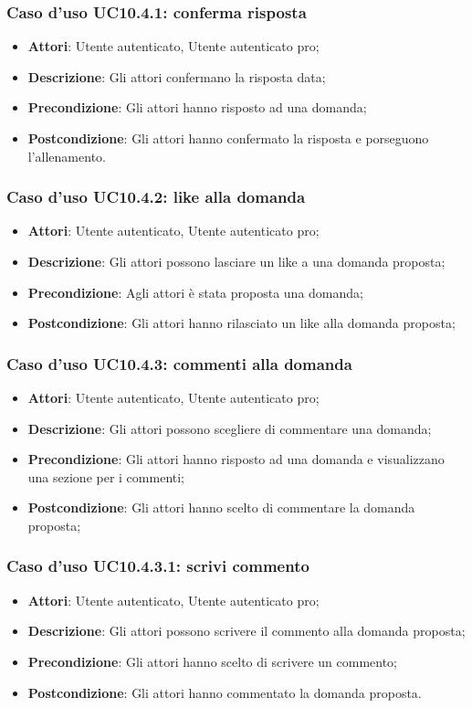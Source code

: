 \subsubsection{Caso d'uso UC10.4.1: conferma risposta}
	\begin{itemize}
		\item \textbf{Attori}: Utente autenticato, Utente autenticato pro;
		\item \textbf{Descrizione}: Gli attori confermano la risposta data;
		\item \textbf{Precondizione}: Gli attori hanno risposto ad una domanda;
		\item \textbf{Postcondizione}: Gli attori hanno confermato la risposta e porseguono l'allenamento.
	\end{itemize}
\subsubsection{Caso d'uso UC10.4.2: like alla domanda}
	\begin{itemize}
		\item \textbf{Attori}: Utente autenticato, Utente autenticato pro;
		\item \textbf{Descrizione}: Gli attori possono lasciare un like a una domanda proposta;
		\item \textbf{Precondizione}: Agli attori è stata proposta una domanda;
		\item \textbf{Postcondizione}: Gli attori hanno rilasciato un like alla domanda proposta;
	\end{itemize}
\subsubsection{Caso d'uso UC10.4.3: commenti alla domanda}
	\begin{itemize}
		\item \textbf{Attori}: Utente autenticato, Utente autenticato pro;
		\item \textbf{Descrizione}: Gli attori possono scegliere di commentare una domanda;
		\item \textbf{Precondizione}: Gli attori hanno risposto ad una domanda e visualizzano una sezione per i commenti;
		\item \textbf{Postcondizione}: Gli attori hanno scelto di commentare la domanda proposta;
	\end{itemize}
\subsubsection{Caso d'uso UC10.4.3.1: scrivi commento}
	\begin{itemize}
		\item \textbf{Attori}: Utente autenticato, Utente autenticato pro;
		\item \textbf{Descrizione}: Gli attori possono scrivere il commento alla domanda proposta;
		\item \textbf{Precondizione}: Gli attori hanno scelto di scrivere un commento;
		\item \textbf{Postcondizione}: Gli attori hanno commentato la domanda proposta.
	\end{itemize}
